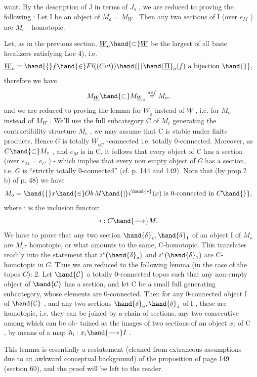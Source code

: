 
want. By the description of J in terms of $J_o$ , we are  reduced to proving
the following
\hand{\uline{\textcolor{black}{Lemma}}}: Let I be an object of $M_a = M_{\underline{W}}$ . Then any two sections of I (over
$e_M$ ) are $M_c$ - homotopic.

Let, as in the previous section, $\underline{W}_o \hand{\subset} \underline{W}$ be the largest of all basic
localizers satisfying Loc 4), i.e.
\[ \underline{W}_o = \hand{\{} f \hand{\in} Fl((Cat)) \hand{|} \hand{\underline{\Pi}}_o(f) \text{ a bijection } \hand{\}} , \]
therefore we have
\[ M_{\underline{W}} \hand{\subset} M_{\underline{W}_o} \overset{def}{=} M_o , \]
and we are reduced to proving the lemma for $\underline{W}_o$ instead of $\underline{W}$ , i.e. for $M_o$
instead of $M_{\underline{W}}$ . We'll use the  full subcategory C of $M_c$ generating the
contractibility structure $M_c$ , we may assume that C is stable under finite
products. Hence $C\hat{}$ is totally $\underline{W}_{oC}$ -connected i.e. totally 0-connected.
Moreover, as $C \hand{\subset} M_c$ ,  and $e_M$ is in C, it follows that every object
of C has a section (over $e_M = e_C$ ) - which implies that every non empty
object of $C\hat{}$ has a section, i.e. $C\hat{}$ is ``strictly totally 0-connected''
(cf. p. 144 and 149). Note that (by prop.2 b) of p. 48) we have
\[ M_o = \hand{\{} x \hand{\in} Ob\, M \hand{|} i^{\hand{*}}(x) \text{ is 0-connected in } C\hat{} \hand{\}} , \]
where i is the inclusion functor:
\[ i: C \hand{\longrightarrow} M . \]
We have to prove that any two section $\hand{\delta}_o,\hand{\delta}_1$ of an object I of $M_o$ are $M_c$-
homotopic, or what amounts to the same, C-homotopic. This translates
readily into the statement that $i^*(\hand{\delta}_o)$ and $i^*(\hand{\delta}_1)$ are C-homotopic in $C\hat{}$.
Thus we are reduced to the following lemma (in the case of the topos $C\hat{}$):
\hand{\uline{\textcolor{black}{Lemma}}} 2. Let $\hand{\mathcal{C}}$  a totally 0-connected topos such that any non-empty object
of $\hand{\mathcal{C}}$ has a section, and let C be a small full generating subcategory,
whose elements are 0-connected. Then for any 0-connected object I of $\hand{\mathcal{C}}$ ,
and any two sections $\hand{\delta}_o,\hand{\delta}_1$ of I , these are homotopic, i.e. they can be
joined by a  chain of sections, any two consecutive among which can be ob-%
tained as the images of two sections  of an object $x_i$ of C , by means of a
map $h_i : x_i \hand{\longrightarrow} I$ .

This lemma is essentially a restatement (cleaned from extraneous 
assumptions due to an awkward conceptual background) of the proposition of
page 149 (section 60), and the proof will be left to the reader.

